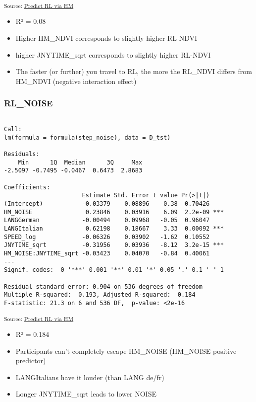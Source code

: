 \documentclass[
  letterpaper,
  DIV=11,
  numbers=noendperiod]{scrartcl}
\providecommand{\tightlist}{%
  \setlength{\itemsep}{0pt}\setlength{\parskip}{0pt}}
\begin{document}
\textsubscript{Source:
\href{https://LGraz.github.io/wsl--prs-analysis/notebooks/RL-via-HM-preview.html\#cell-lm-summary-rl-ndvi}{Predict
RL via HM}}

\begin{itemize}
\tightlist
\item
  R² = 0.08
\item
  Higher HM\_NDVI corresponds to slightly higher RL-NDVI
\item
  higher JNYTIME\_sqrt corresponds to slightly higher RL-NDVI
\item
  The faster (or further) you travel to RL, the more the RL\_NDVI
  differs from HM\_NDVI (negative interaction effect)
\end{itemize}

\subsubsection{RL\_NOISE}\label{rl_noise}

\begin{verbatim}

Call:
lm(formula = formula(step_noise), data = D_tst)

Residuals:
    Min      1Q  Median      3Q     Max 
-2.5097 -0.7495 -0.0467  0.6473  2.8683 

Coefficients:
                      Estimate Std. Error t value Pr(>|t|)    
(Intercept)           -0.03379    0.08896   -0.38  0.70426    
HM_NOISE               0.23846    0.03916    6.09  2.2e-09 ***
LANGGerman            -0.00494    0.09968   -0.05  0.96047    
LANGItalian            0.62198    0.18667    3.33  0.00092 ***
SPEED_log             -0.06326    0.03902   -1.62  0.10552    
JNYTIME_sqrt          -0.31956    0.03936   -8.12  3.2e-15 ***
HM_NOISE:JNYTIME_sqrt -0.03423    0.04070   -0.84  0.40061    
---
Signif. codes:  0 '***' 0.001 '**' 0.01 '*' 0.05 '.' 0.1 ' ' 1

Residual standard error: 0.904 on 536 degrees of freedom
Multiple R-squared:  0.193, Adjusted R-squared:  0.184 
F-statistic: 21.3 on 6 and 536 DF,  p-value: <2e-16
\end{verbatim}

\textsubscript{Source:
\href{https://LGraz.github.io/wsl--prs-analysis/notebooks/RL-via-HM-preview.html\#cell-lm-summary-rl-noise}{Predict
RL via HM}}

\begin{itemize}
\tightlist
\item
  R² = 0.184
\item
  Participants can't completely escape HM\_NOISE (HM\_NOISE positive
  predictor)
\item
  LANGItalians have it louder (than LANG de/fr)
\item
  Longer JNYTIME\_sqrt leads to lower NOISE
\end{itemize}
\end{document}
